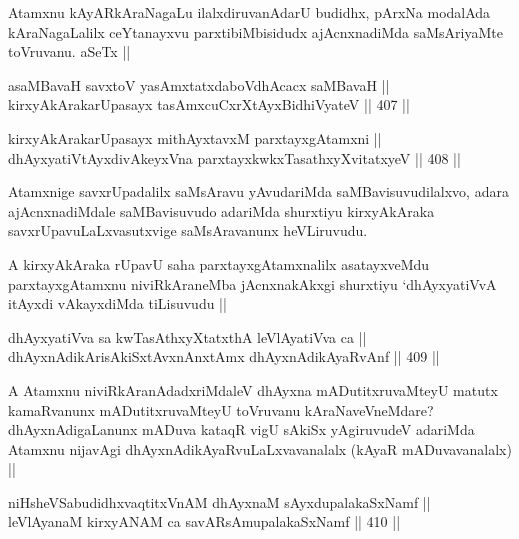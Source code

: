 \begin{artha}
Atamxnu kAyARkAraNagaLu ilalxdiruvanAdarU budidhx, pArxNa modalAda kAraNagaLalilx ceYtanayxvu parxtibiMbisidudx ajAcnxnadiMda saMsAriyaMte toVruvanu. aSeTx ||
\end{artha}


\begin{shl}
asaMBavaH savxtoV yasAmxtatxdaboVdhAcacx saMBavaH || \\
kirxyAkArakarUpasayx tasAmxcuCxrXtAyx\s BidhiVyateV ||  407 || 
\end{shl}
				
\begin{shl}
kirxyAkArakarUpasayx mithAyxtavxM parxtayxgAtamxni || \\
dhAyxyatiVtAyxdivAkeyxVna parxtayxkwkxTasathxyXvitatxyeV ||  408 ||  
\end{shl}

\begin{artha}
Atamxnige savxrUpadalilx saMsAravu yAvudariMda saMBavisuvudilalxvo, adara ajAcnxnadiMdale saMBavisuvudo adariMda shurxtiyu kirxyAkAraka savxrUpavuLaLxvasutxvige saMsAravanunx heVLiruvudu.
\end{artha}

\begin{artha}
A kirxyAkAraka rUpavU saha parxtayxgAtamxnalilx asatayxveMdu parxtayxgAtamxnu niviRkAraneMba jAcnxnakAkxgi shurxtiyu `dhAyxyatiVvA itAyxdi vAkayxdiMda tiLisuvudu ||
\end{artha}

\begin{shl}
dhAyxyatiVva sa kwTasAthxyXtatxthA leVlAyatiVva ca || \\
dhAyxnAdikArisAkiSxtAvxnAnx\s \s tAmx dhAyxnAdikAyaRvAnf ||  409 ||  
\end{shl}

\begin{artha}
A Atamxnu niviRkAranAdadxriMdaleV dhAyxna mADutitxruvaMteyU matutx kamaRvanunx mADutitxruvaMteyU toVruvanu kAraNaveVneMdare? dhAyxnAdigaLanunx mADuva kataqR vigU sAkiSx yAgiruvudeV adariMda Atamxnu nijavAgi dhAyxnAdikAyaRvuLaLxvavanalalx (kAyaR mADuvavanalalx) ||
\end{artha}


\begin{shl}
niHsheVSabudidhxvaqtitxVnAM dhAyxnaM sAyxdupalakaSxNamf || \\
leVlAyanaM kirxyANAM ca savARsAmupalakaSxNamf ||  410 ||  
\end{shl}


